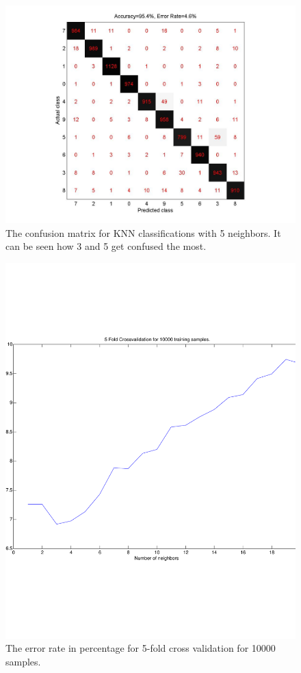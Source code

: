 \begin{figure}[H]
\centering
\includegraphics[width=\linewidth]{code/confusm_k5}
\caption{The confusion matrix for KNN classifications with 5 neighbors. It can be seen how 3 and 5 get confused the most.\label{fig:knn}}
\end{figure}
\begin{figure}[H]
\centering
\includegraphics[width=0.6\linewidth, trim= 0mm 30mm 0mm 30mm, clip]{code/5fold_knn_10000samples}
\caption{The error rate in percentage for 5-fold cross validation for 10000 samples.\label{fig:knn_small}}
\end{figure}
